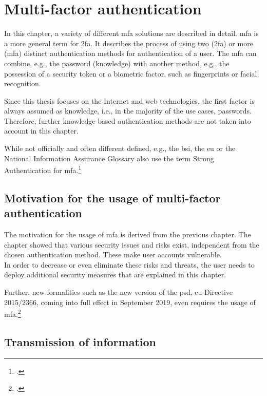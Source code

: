 \chapter{Multi-factor authentication}

In this chapter, a variety of different \gls{mfa} solutions are described in detail. \Gls{mfa} is a more general term for \gls{2fa}. It describes the process of using two (\gls{2fa}) or more (\gls{mfa}) distinct authentication methods for authentication of a user. The \gls{mfa} can combine, e.g., the password (knowledge) with another method, e.g., the possession of a security token or a biometric factor, such as fingerprints or facial recognition.

Since this thesis focuses on the Internet and web technologies, the first factor is always assumed as knowledge, i.e., in the majority of the use cases, passwords. Therefore, further knowledge-based authentication methods are not taken into account in this chapter.

While not officially and often different defined, e.g., the \gls{bsi}, the \gls{eu} or the National Information Assurance Glossary also use the term Strong Authentication for \gls{mfa}.\footcites[See][47]{CNSS4009}[See][11]{deutschland2018grundschutz}

\section{Motivation for the usage of multi-factor authentication}

The motivation for the usage of \gls{mfa} is derived from the previous chapter. The chapter showed that various security issues and risks exist, independent from the chosen authentication method. These make user accounts vulnerable.\\
 In order to decrease or even eliminate these risks and threats, the user needs to deploy additional security measures that are explained in this chapter.
 
 Further, new formalities such as the new version of the \gls{psd}, \gls{eu} Directive 2015/2366, coming into full effect in September 2019, even requires the usage of \gls{mfa}.\footcites[See][10]{NOCTOR20189}

\newpage

\section{Transmission of information}

